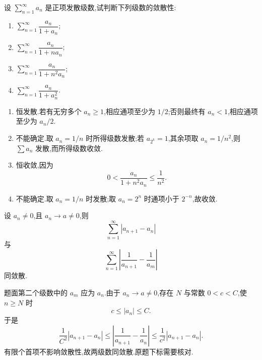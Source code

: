 \begin{example}
    设 $\displaystyle\sum\limits_{n=1}^{\infty}a_n$ 是正项发散级数,试判断下列级数的敛散性:
    \begin{enumerate}
        \item $\displaystyle\sum\limits_{n=1}^{\infty}\dfrac{a_n}{1+a_n}$;
        \item $\displaystyle\sum\limits_{n=1}^{\infty}\dfrac{a_n}{1+na_n}$;
        \item $\displaystyle\sum\limits_{n=1}^{\infty}\dfrac{a_n}{1+n^2a_n}$;
        \item $\displaystyle\sum\limits_{n=1}^{\infty}\dfrac{a_n}{1+a_n^2}$.
    \end{enumerate}
\end{example}
\exampleblank

\begin{solution}
    \leavevmode
    \begin{enumerate}
        \item 恒发散.若有无穷多个 $a_n\geq1$,相应通项至少为 $1/2$;否则最终有 $a_n<1$,相应通项至少为 $a_n/2$.
        \item 不能确定.取 $a_n=1/n$ 时所得级数发散;若 $a_{2^k}=1$,其余项取 $a_n=1/n^2$,则 $\displaystyle \sum a_n$ 发散,而所得级数收敛.
        \item 恒收敛,因为
              \[
                  0<\dfrac{a_n}{1+n^2a_n}\leq\dfrac{1}{n^2}.
              \]
        \item 不能确定.取 $a_n=1/n$ 时发散;取 $a_n=2^n$ 时通项小于 $2^{-n}$,故收敛.
    \end{enumerate}
\end{solution}

\begin{example}
    设 $a_n\neq0$,且 $a_n\to a\neq0$,则
    \[
        \displaystyle\sum\limits_{n=1}^{\infty}|a_{n+1}-a_n|
    \]
    与
    \[
        \displaystyle\sum\limits_{n=1}^{\infty}\left|\dfrac{1}{a_{n+1}}-\dfrac{1}{a_m}\right|
    \]
    同敛散.
\end{example}
\exampleblank

\begin{solution}
    题面第二个级数中的 $a_m$ 应为 $a_n$.由于 $a_n\to a\neq0$,存在 $N$ 与常数 $0<c<C$,使 $n\geq N$ 时
    \[
        c\leq|a_n|\leq C.
    \]
    于是
    \[
        \dfrac{1}{C^2}|a_{n+1}-a_n|
        \leq
        \left|\dfrac{1}{a_{n+1}}-\dfrac{1}{a_n}\right|
        \leq\dfrac{1}{c^2}|a_{n+1}-a_n|.
    \]
    有限个首项不影响敛散性,故两级数同敛散.原题下标需要核对.
\end{solution}

